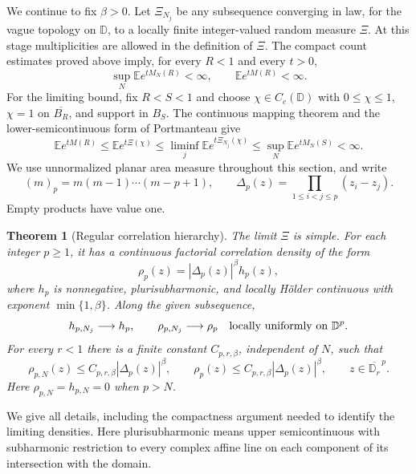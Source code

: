 \documentclass[11pt,a4paper]{article}
\numberwithin{equation}{section}
\newtheorem{theorem}{Theorem}[section]
\theoremstyle{definition}
\theoremstyle{remark}
\newcommand{\D}{\mathbb D}
\newcommand{\E}{\mathbb E}
\begin{document}
We continue to fix $\beta>0$.  Let $\Xi_{N_j}$ be any subsequence
converging in law, for the vague topology on $\D$, to a locally finite
integer-valued random measure $\Xi$.  At this stage multiplicities are
allowed in the definition of $\Xi$.  The compact count estimates proved
above imply, for every $R<1$ and every $t>0$,
\begin{equation}
 \sup_N \E e^{tM_N(R)}<\infty,
 \qquad \E e^{tM(R)}<\infty.
 \label{hier:exponential-moments}
\end{equation}
For the limiting bound, fix $R<S<1$ and choose $\chi\in C_c(\D)$
with $0\leq\chi\leq1$, $\chi=1$ on $\overline{B_R}$, and support
in $B_S$. The continuous mapping theorem and the lower-semicontinuous
form of Portmanteau give
\[
 \E e^{tM(R)}\leq\E e^{t\Xi(\chi)}
 \leq\liminf_j\E e^{t\Xi_{N_j}(\chi)}
 \leq\sup_N\E e^{tM_N(S)}<\infty.
\]
We use unnormalized planar area measure throughout this section, and write
\[
 (m)_p=m(m-1)\cdots(m-p+1),\qquad
 \Delta_p(z)=\prod_{1\le i<j\le p}(z_i-z_j).
\]
Empty products have value one.

\begin{theorem}[Regular correlation hierarchy]
\label{thm:hierarchy}
The limit $\Xi$ is simple.  For each integer $p\ge1$, it has a continuous
factorial correlation density of the form
\begin{equation}
 \rho_p(z)=|\Delta_p(z)|^\beta h_p(z),
 \label{hier:limiting-factorization}
\end{equation}
where $h_p$ is nonnegative, plurisubharmonic, and locally H\"older
continuous with exponent $\min\{1,\beta\}$.  Along the given subsequence,
\begin{equation}
 h_{p,N_j}\longrightarrow h_p,
 \qquad \rho_{p,N_j}\longrightarrow\rho_p
 \quad\hbox{locally uniformly on }\D^p.
 \label{hier:uniform-convergence}
\end{equation}
For every $r<1$ there is a finite constant $C_{p,r,\beta}$, independent
of $N$, such that
\begin{equation}
 \rho_{p,N}(z)\le C_{p,r,\beta}|\Delta_p(z)|^\beta,
 \qquad
 \rho_p(z)\le C_{p,r,\beta}|\Delta_p(z)|^\beta,
 \qquad z\in\overline{\D_r}^{\,p}.
 \label{hier:vandermonde-bound}
\end{equation}
Here $\rho_{p,N}=h_{p,N}=0$ when $p>N$.
\end{theorem}

We give all details, including the compactness argument needed to
identify the limiting densities.
Here plurisubharmonic means upper semicontinuous with subharmonic
restriction to every complex affine line on each component of its
intersection with the domain.
\end{document}
